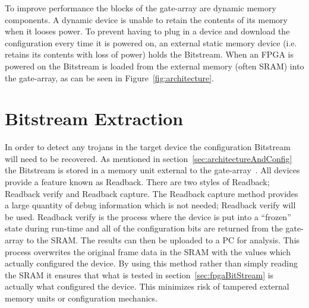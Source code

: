 To improve performance the blocks of the gate-array are dynamic memory components.
A dynamic device is unable to retain the contents of its memory when it looses power.
To prevent having to plug in a device and download the configuration every time it is powered on, an external static memory device (i.e. retains its contents with loss of power) holds the \gls{Bitstream}. 
When an \acrshort{FPGA} is powered on the \gls{Bitstream} is loaded from the external memory (often \acrfull{SRAM}) into the gate-array, as can be seen in Figure~\ref{fig:architecture}.


\section{\gls{Bitstream} Extraction} \label{sec:bitstreamExtraction}
In order to detect any trojans in the \gls{target} device the configuration \gls{Bitstream} will need to be recovered.
As mentioned in section~\ref{sec:architectureAndConfig} the \gls{Bitstream} is stored in a memory unit external to the gate-array~\cite{virtex5ConfigGuide}.
All \Xilinx devices provide a feature known as \gls{Readback}.
There are two styles of \gls{Readback}; \gls{Readback} verify and \gls{Readback} capture.
The \gls{Readback} capture method provides a large quantity of debug information which is not needed; \gls{Readback} verify will be used.
\gls{Readback} verify is the process where the device is put into a ``frozen'' state during run-time and all of the configuration bits are returned from the gate-array to the \acrshort{SRAM}. 
The results can then be uploaded to a \acrfull{PC} for analysis.
This process overwrites the original frame data in the \acrshort{SRAM} with the values which actually configured the device. 
By using this method rather than simply reading the \acrshort{SRAM} it ensures that what is tested in section~\ref{sec:fpgaBitStream} is actually what configured the device.
This minimizes risk of tampered external memory units or configuration mechanics. 


